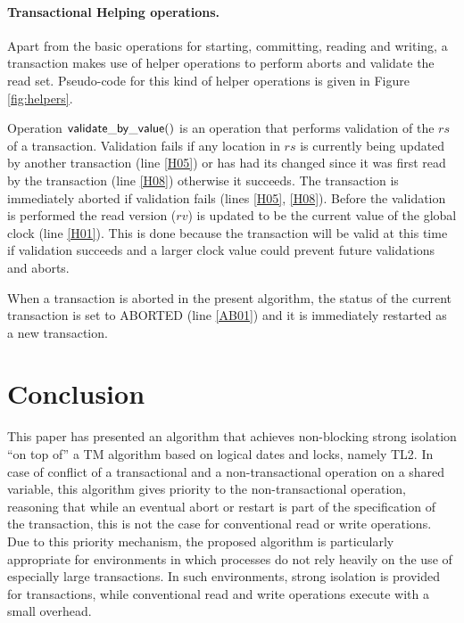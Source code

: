 \documentclass[runningheads,a4paper]{llncs}
\begin{document}
\paragraph{Transactional Helping operations.} 
Apart from the basic operations for starting, committing, 
reading and writing, a transaction makes use of helper 
operations to perform aborts and validate the read set.
 Pseudo-code for this kind of helper operations 
is given in Figure \ref{fig:helpers}.

Operation ${\sf validate\_by\_value()}$ is an operation that performs 
validation of the $\mathit{rs}$ of a transaction. 
Validation fails 
if any location in $\mathit{rs}$ is 
currently being updated by another transaction (line \ref{H05})
or has had its changed since it was first read by the transaction (line \ref{H08})
otherwise it succeeds.
The transaction is immediately aborted if validation fails (lines \ref{H05}, \ref{H08}).
Before the validation is performed the read version ($\mathit{rv}$) is updated
to be the current value of the global clock (line \ref{H01}).
This is done because the transaction will be valid at this time
if validation succeeds and a larger
clock value could prevent future validations and aborts.

When a transaction is aborted in the present algorithm, 
the status of the current transaction is set to ABORTED (line \ref{AB01}) and
it is immediately restarted as a new transaction.


\section{Conclusion}
\label{sec:conclusions}
This paper has presented an algorithm that achieves non-blocking strong 
isolation  ``on top of'' a TM algorithm based on logical dates and locks, 
namely  TL2. 
In case of conflict of a transactional and a non-transactional
operation on a shared variable, this algorithm gives priority to 
the non-transactional operation, 
reasoning that while an eventual abort or restart is part of the 
specification of the transaction,
this is not the case for conventional read or write operations. 
Due to this priority mechanism, 
the proposed algorithm is   particularly appropriate  for environments 
in which processes do not rely heavily
on the use of especially large transactions.
In such environments, strong isolation is  provided for transactions, 
while conventional read and write operations execute with a small overhead.
\end{document}
